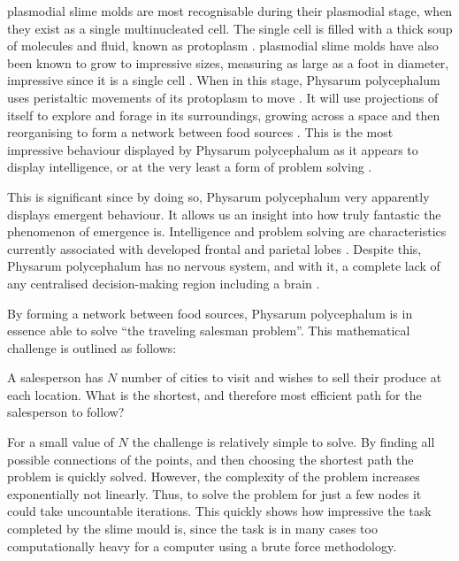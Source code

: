 \documentclass[]{report}
\begin{document}
\Glspl{plasmodial slime mold} are most recognisable during their plasmodial stage, when they exist as a single multinucleated cell. The single cell is filled with a thick soup of molecules and fluid, known as protoplasm \cite{alim_physarum_2013}. \Glspl{plasmodial slime mold} have also been known to grow to impressive sizes, measuring as large as a foot in diameter, impressive since it is a single cell \cite{jabr_how_2012}. When in this stage, \Gls{Physarum polycephalum} uses peristaltic movements of its protoplasm to move \cite{Britannica_slime_2019, alim_physarum_2013}. It will use projections of itself to explore and forage in its surroundings, growing across a space and then reorganising to form a network between food sources \cite{jabr_how_2012, patino-ramirez_substrate_2019}. This is the most impressive behaviour displayed by \Gls{Physarum polycephalum} as it appears to display intelligence, or at the very least a form of problem solving \cite{alim_physarum_2013}.

This is significant since by doing so, \Gls{Physarum polycephalum} very apparently displays emergent behaviour. It allows us an insight into how truly fantastic the phenomenon of emergence is. Intelligence and problem solving are characteristics currently associated with developed frontal and parietal lobes \cite{noauthor_where_nodate}. Despite this, \Gls{Physarum polycephalum} has no nervous system, and with it, a complete lack of any centralised decision-making region including a brain \cite{alim_physarum_2013}.

By forming a network between food sources, \Gls{Physarum polycephalum} is in essence able to solve “the traveling salesman problem”. This mathematical challenge is outlined as follows:

A salesperson has $N$ number of cities to visit and wishes to sell their produce at each location. What is the shortest, and therefore most efficient path for the salesperson to follow?

For a small value of $N$ the challenge is relatively simple to solve. By finding all possible connections of the points, and then choosing the shortest path the problem is quickly solved. However, the complexity of the problem increases exponentially not linearly. Thus, to solve the problem for just a few nodes it could take uncountable iterations. This quickly shows how impressive the task completed by the slime mould is, since the task is in many cases too computationally heavy for a computer using a brute force methodology.
\end{document}

